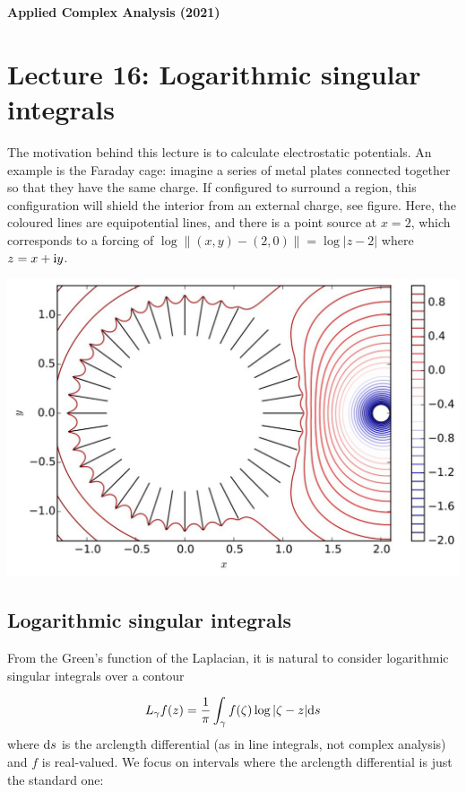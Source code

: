 \documentclass[12pt,landscape]{article}
\def\D{ {\rm d} }
\def\I{ {\rm i} }
\def\cent#1{\begin{center}#1\end{center} }
\begin{document}
{\LARGE
\sf
\textbf{Applied Complex Analysis (2021)}

\section{Lecture 16: Logarithmic singular integrals}
%
%
%
The motivation behind this lecture is to calculate electrostatic potentials. An example is the Faraday cage: imagine a series of metal plates connected together so that they have the same charge. If configured to surround a region, this configuration will shield the interior from an external charge, see figure. Here, the coloured lines are equipotential lines, and there is a point source at $x = 2$, which corresponds to a forcing of $\log\| (x,y)  - (2,0) \| = \log|z - 2|$ where  $z = x + \I y$.
\cent{\includegraphics[width=0.67\linewidth]{Laplacetangentialplot.pdf}}


\subsection{Logarithmic singular integrals}
From the Green's function of the Laplacian, it is natural to consider logarithmic singular integrals over a contour

\[
L_\gamma f(z) = {1 \over \pi} \int_\gamma f(\zeta) \log|\zeta-z| \D s
\]
where $\D s$ is the arclength differential (as in line integrals, not complex analysis) and $f$ is real-valued. We focus on intervals where the arclength differential is just the standard one:

}
\end{document}
